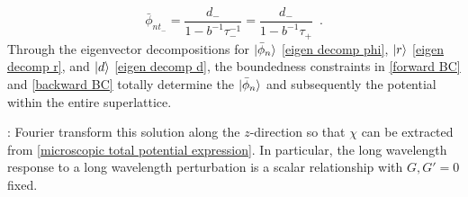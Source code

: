 \begin{equation}
    \label{backward BC}
    \bar\phi_{nt_-} = \frac{d_-}{1-b^{-1}\tau_-^{-1}} = \frac{d_-}{1-b^{-1}\tau_+}
    \,\,\,.
\end{equation}
Through the eigenvector decompositions for $\lvert\bar\phi_n\rangle$ \eqref{eigen decomp phi}, $\lvert r\rangle$ \eqref{eigen decomp r}, and $\lvert d\rangle$ \eqref{eigen decomp d}, the boundedness constraints in \eqref{forward BC} and \eqref{backward BC} totally determine the $\lvert\bar\phi_n\rangle$ and subsequently the potential within the entire superlattice.

: Fourier transform this solution along the $z$-direction so that $\chi$ can be extracted from \eqref{microscopic total potential expression}.  In particular, the long wavelength response to a long wavelength perturbation is a scalar relationship with $G,G'=0$ fixed.
